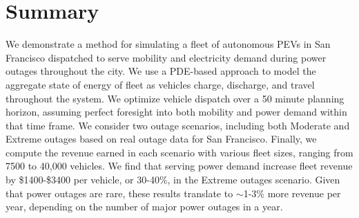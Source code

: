 \documentclass[journal]{IEEEtran}
\begin{document}
\section{Summary}
We demonstrate a method for simulating a fleet of autonomous PEVs in San Francisco dispatched to serve mobility and electricity demand during power outages throughout the city. We use a PDE-based approach to model the aggregate state of energy of fleet as vehicles charge, discharge, and travel throughout the system. We optimize vehicle dispatch over a 50 minute planning horizon, assuming perfect foresight into both mobility and power demand within that time frame. We consider two outage scenarios, including both Moderate and Extreme outages based on real outage data for San Francisco. Finally, we compute the revenue earned in each scenario with various fleet sizes, ranging from 7500 to 40,000 vehicles. We find that serving power demand increase fleet revenue by \$1400-\$3400 per vehicle, or 30-40\%, in the Extreme outages scenario. Given that power outages are rare, these results translate to $\sim$1-3\% more revenue per year, depending on the number of major power outages in a year.




\end{document}
